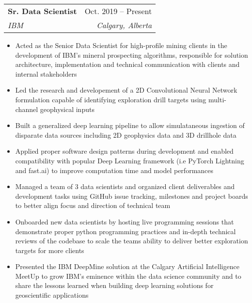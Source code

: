 \documentclass[letterpaper,11pt]{article}
\makeatletter
\newcommand{\resumeItem}[1]{
  \item\small{
    {#1 \vspace{-2pt}}
  }
}
\newcommand{\resumeSubheading}[4]{
  \vspace{-2pt}\item
    \begin{tabular*}{0.97\textwidth}[t]{l@{\extracolsep{\fill}}r}
      \textbf{#1} & #2 \\
      \textit{\small#3} & \textit{\small #4} \\
    \end{tabular*}\vspace{-7pt}
}
\newcommand{\resumeItemListStart}{\begin{itemize}}
\newcommand{\resumeItemListEnd}{\end{itemize}\vspace{-5pt}}
\makeatother
\begin{document}
    \resumeSubheading
      {Sr. Data Scientist}{Oct. 2019 -- Present}
      {IBM}{Calgary, Alberta}
      \resumeItemListStart
        \resumeItem{Acted as the Senior Data Scientist for high-profile mining clients in the development of IBM’s mineral 
        prospecting algorithms, responsible for solution architecture, implementation and technical communication 
        with clients and internal stakeholders}
        \resumeItem{Led the research and developement of a 2D Convolutional Neural Network formulation capable of identifying 
        exploration drill targets using multi-channel geophysical inputs}
        \resumeItem{Built a generalized deep learning pipeline to allow simulataneous ingestion of disparate data 
        sources including 2D geophysics data and 3D drillhole data}
        \resumeItem{Applied proper software design patterns during development and enabled compatibility with 
        popular Deep Learning framework (i.e PyTorch Lightning and fast.ai) to improve computation time and 
        model performances}
        \resumeItem{Managed a team of 3 data scientists and organized client deliverables and development 
        tasks using GitHub issue tracking, milestones and project boards to better align focus and 
        direction of technical team}
        \resumeItem{Onboarded new data scientists by hosting live programming sessions that demonstrate proper 
        python programming practices and in-depth technical reviews of the codebase to scale the teams ability to 
        deliver better exploration targets for more clients}
        \resumeItem{Presented the IBM DeepMine solution at the Calgary Artificial Intelligence MeetUp to grow 
        IBM’s eminence within the data science community and to share the lessons learned when building 
        deep learning solutions for geoscientific applications}
      \resumeItemListEnd
\end{document}
